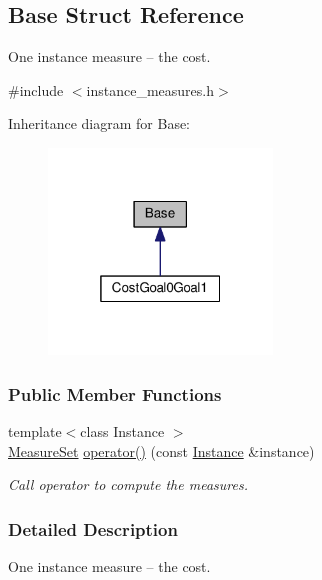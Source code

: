 \hypertarget{structBase}{}\subsection{Base Struct Reference}
\label{structBase}


One instance measure -- the cost.  




{\ttfamily \#include $<$instance\+\_\+measures.\+h$>$}



Inheritance diagram for Base\+:\nopagebreak
\begin{figure}[H]
\begin{center}
\leavevmode
\includegraphics[width=169pt]{structBase__inherit__graph}
\end{center}
\end{figure}
\subsubsection*{Public Member Functions}
\begin{DoxyCompactItemize}
\item 
{\footnotesize template$<$class Instance $>$ }\\\hyperlink{structMeasureSet}{Measure\+Set} \hyperlink{structBase_aec313697ad85843ffcd81c13ba5623a6}{operator()} (const \hyperlink{structInstance}{Instance} \&instance)
\begin{DoxyCompactList}\small\item\em Call operator to compute the measures. \end{DoxyCompactList}\end{DoxyCompactItemize}


\subsubsection{Detailed Description}
One instance measure -- the cost. 

